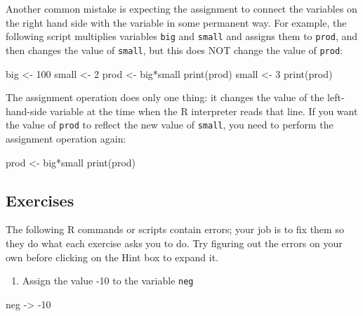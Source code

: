 \documentclass[
  letterpaper,
  DIV=11,
  numbers=noendperiod]{scrreprt}
\newenvironment{Shaded}{\begin{snugshade}}{\end{snugshade}}
\newcommand{\NormalTok}[1]{\textcolor[rgb]{0.00,0.23,0.31}{#1}}
\providecommand{\tightlist}{%
  \setlength{\itemsep}{0pt}\setlength{\parskip}{0pt}}\usepackage{longtable,booktabs,array}
\begin{document}
Another common mistake is expecting the assignment to connect the
variables on the right hand side with the variable in some permanent
way. For example, the following script multiplies variables \texttt{big}
and \texttt{small} and assigns them to \texttt{prod}, and then changes
the value of \texttt{small}, but this does NOT change the value of
\texttt{prod}:

\begin{Shaded}
\begin{Highlighting}[]
\NormalTok{big \textless{}{-} 100}
\NormalTok{small \textless{}{-} 2}
\NormalTok{prod \textless{}{-} big*small}
\NormalTok{print(prod)}
\NormalTok{small \textless{}{-} 3}
\NormalTok{print(prod)}
\end{Highlighting}
\end{Shaded}

The assignment operation does only one thing: it changes the value of
the left-hand-side variable at the time when the R interpreter reads
that line. If you want the value of \texttt{prod} to reflect the new
value of \texttt{small}, you need to perform the assignment operation
again:

\begin{Shaded}
\begin{Highlighting}[]
\NormalTok{prod \textless{}{-} big*small}
\NormalTok{print(prod)}
\end{Highlighting}
\end{Shaded}

\hypertarget{exercises-1}{%
\subsection*{Exercises}\label{exercises-1}}

The following R commands or scripts contain errors; your job is to fix
them so they do what each exercise asks you to do. Try figuring out the
errors on your own before clicking on the Hint box to expand it.

\begin{enumerate}
\def\labelenumi{\arabic{enumi}.}
\tightlist
\item
  Assign the value -10 to the variable \texttt{neg}
\end{enumerate}

\begin{Shaded}
\begin{Highlighting}[]
\NormalTok{neg {-}\textgreater{} {-}10}
\end{Highlighting}
\end{Shaded}
\end{document}
